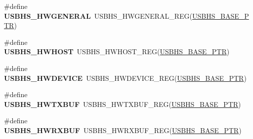 \begin{DoxyCompactItemize}
\item 
\hypertarget{group___u_s_b_h_s___register___accessor___macros_ga2e12f7575a1e736722899e51cbc2f8d2}{}\#define {\bfseries U\+S\+B\+H\+S\+\_\+\+H\+W\+G\+E\+N\+E\+R\+A\+L}~U\+S\+B\+H\+S\+\_\+\+H\+W\+G\+E\+N\+E\+R\+A\+L\+\_\+\+R\+E\+G(\hyperlink{group___u_s_b_h_s___peripheral_gaa2bc10b8cd66f96acd39e15b3a581306}{U\+S\+B\+H\+S\+\_\+\+B\+A\+S\+E\+\_\+\+P\+T\+R})\label{group___u_s_b_h_s___register___accessor___macros_ga2e12f7575a1e736722899e51cbc2f8d2}

\item 
\hypertarget{group___u_s_b_h_s___register___accessor___macros_ga0325dd12026e0b5e87001fe3681b2ab8}{}\#define {\bfseries U\+S\+B\+H\+S\+\_\+\+H\+W\+H\+O\+S\+T}~U\+S\+B\+H\+S\+\_\+\+H\+W\+H\+O\+S\+T\+\_\+\+R\+E\+G(\hyperlink{group___u_s_b_h_s___peripheral_gaa2bc10b8cd66f96acd39e15b3a581306}{U\+S\+B\+H\+S\+\_\+\+B\+A\+S\+E\+\_\+\+P\+T\+R})\label{group___u_s_b_h_s___register___accessor___macros_ga0325dd12026e0b5e87001fe3681b2ab8}

\item 
\hypertarget{group___u_s_b_h_s___register___accessor___macros_ga51211033e3524fa07fc6c6afd410c593}{}\#define {\bfseries U\+S\+B\+H\+S\+\_\+\+H\+W\+D\+E\+V\+I\+C\+E}~U\+S\+B\+H\+S\+\_\+\+H\+W\+D\+E\+V\+I\+C\+E\+\_\+\+R\+E\+G(\hyperlink{group___u_s_b_h_s___peripheral_gaa2bc10b8cd66f96acd39e15b3a581306}{U\+S\+B\+H\+S\+\_\+\+B\+A\+S\+E\+\_\+\+P\+T\+R})\label{group___u_s_b_h_s___register___accessor___macros_ga51211033e3524fa07fc6c6afd410c593}

\item 
\hypertarget{group___u_s_b_h_s___register___accessor___macros_ga30be0dc8dc1728f1a8cb60542b5a44f1}{}\#define {\bfseries U\+S\+B\+H\+S\+\_\+\+H\+W\+T\+X\+B\+U\+F}~U\+S\+B\+H\+S\+\_\+\+H\+W\+T\+X\+B\+U\+F\+\_\+\+R\+E\+G(\hyperlink{group___u_s_b_h_s___peripheral_gaa2bc10b8cd66f96acd39e15b3a581306}{U\+S\+B\+H\+S\+\_\+\+B\+A\+S\+E\+\_\+\+P\+T\+R})\label{group___u_s_b_h_s___register___accessor___macros_ga30be0dc8dc1728f1a8cb60542b5a44f1}

\item 
\hypertarget{group___u_s_b_h_s___register___accessor___macros_gaec218e26a7bfa609699d57213e51a508}{}\#define {\bfseries U\+S\+B\+H\+S\+\_\+\+H\+W\+R\+X\+B\+U\+F}~U\+S\+B\+H\+S\+\_\+\+H\+W\+R\+X\+B\+U\+F\+\_\+\+R\+E\+G(\hyperlink{group___u_s_b_h_s___peripheral_gaa2bc10b8cd66f96acd39e15b3a581306}{U\+S\+B\+H\+S\+\_\+\+B\+A\+S\+E\+\_\+\+P\+T\+R})\label{group___u_s_b_h_s___register___accessor___macros_gaec218e26a7bfa609699d57213e51a508}


\end{DoxyCompactItemize}
